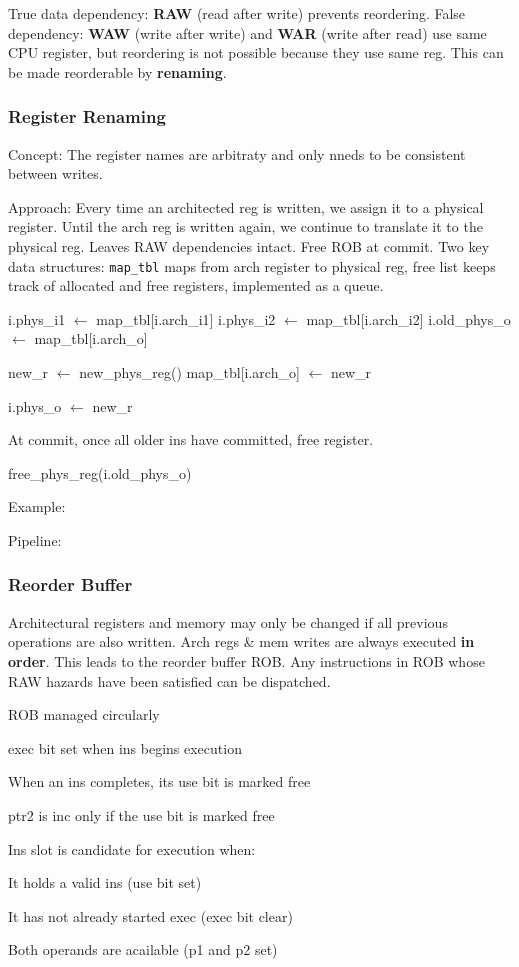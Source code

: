 \documentclass[a4paper, fontsize=8pt, landscape, DIV=1]{scrartcl}
\makeatletter
\renewenvironment{outline}[1][]{%
  \ifthenelse{\equal{#1}{}}{}{\renewcommand{\ol@type}{#1}}%
  \ol@z%
  \newcommand{\0}{\ol@toz\ol@z}%
  \newcommand{\1}{\vspace{\dimexpr\outlinespacingscalar\baselineskip-\baselineskip}\ol@toi\ol@i\item}%
  \newcommand{\2}{\vspace{\dimexpr\outlinespacingscalartwo\baselineskip-\baselineskip}\ol@toii\ol@ii\item}%
  \newcommand{\3}{\vspace{\dimexpr\outlinespacingscalar\baselineskip-\baselineskip}\ol@toiii\ol@iii\item}%
  \newcommand{\4}{\vspace{\dimexpr\outlinespacingscalar\baselineskip-\baselineskip}\ol@toiiii\ol@iiii\item}%
}{%
  \ol@toz\ol@exit%
}
\def\outlinespacingscalar{0.5}
\def\outlinespacingscalartwo{0.5}
\makeatother
\begin{document}
\begin{multicols*}{4}
  True data dependency: \textbf{RAW} (read after write)
  prevents reordering. False dependency: \textbf{WAW} (write after write) and \textbf{WAR} (write after read)
  use same CPU register, but reordering is not possible because they use same reg. This can be made
  reorderable by \textbf{renaming}.

  \subsubsection{Register Renaming}
  Concept: The register names are arbitraty and only nneds to be consistent between writes.

  Approach: Every time an architected reg is written, we assign it to a physical register. Until the arch
  reg is written again, we continue to translate it to the physical reg. Leaves RAW dependencies intact.
  Free ROB at commit. Two key data structures: \texttt{map\_tbl} maps from arch register to physical reg,
  free list keeps track of allocated and free registers, implemented as a queue.
\begin{algorithm}
i.phys_i1 $\gets$ map_tbl[i.arch_i1]
i.phys_i2 $\gets$ map_tbl[i.arch_i2]
i.old_phys_o $\gets$ map_tbl[i.arch_o]

new_r $\gets$ new_phys_reg()
map_tbl[i.arch_o] $\gets$ new_r

i.phys_o $\gets$ new_r
\end{algorithm}
  
  At commit, once all older ins have committed, free register.
\begin{algorithm}
free_phys_reg(i.old_phys_o)
\end{algorithm}

  Example:

  Pipeline:

  \subsubsection{Reorder Buffer}
  Architectural registers and memory may only be changed if all previous operations are
  also written. Arch regs \& mem writes are always executed \textbf{in order}. This leads
  to the reorder buffer ROB. Any instructions in ROB whose RAW hazards have been satisfied
  can be dispatched. 
  \begin{outline}
    \1 ROB managed circularly
      \2 exec bit set when ins begins execution
      \2 When an ins completes, its use bit is marked free
      \2 ptr2 is inc only if the use bit is marked free
    \1 Ins slot is candidate for execution when:
      \2 It holds a valid ins (use bit set)
      \2 It has not already started exec (exec bit clear)
      \2 Both operands are acailable (p1 and p2 set)
  \end{outline}


\end{multicols*}
\end{document}
